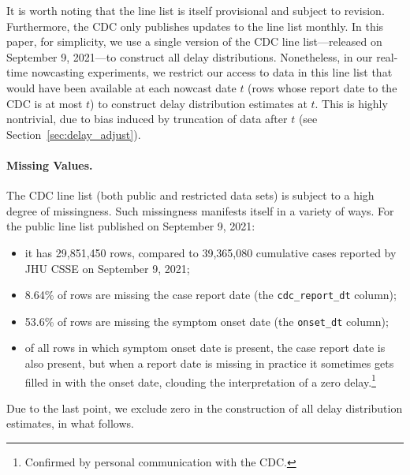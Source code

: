 \documentclass[sts]{imsart}
\theoremstyle{plain}
\theoremstyle{definition}
\theoremstyle{remark}
\begin{document}
It is worth noting that the line list is itself provisional and subject to
revision. Furthermore, the CDC only publishes updates to the line list
monthly. In this paper, for simplicity, we use a single version of the CDC line
list---released on September 9, 2021---to construct all delay
distributions. Nonetheless, in our real-time nowcasting experiments, we 
restrict our access to data in this line list that would have been available at
each nowcast date $t$ (rows whose report date to the CDC is at most $t$) to
construct delay distribution estimates at $t$. This is highly nontrivial, due to
bias induced by truncation of data after $t$ (see
Section~\ref{sec:delay_adjust}). 

\smallskip
\paragraph*{Missing Values.}

The CDC line list (both public and restricted data sets) is subject to a high
degree of missingness. Such missingness manifests itself in a variety of
ways. For the public line list published on September 9, 2021: 
\begin{itemize}
\item it has 29,851,450 rows, compared to 39,365,080 cumulative cases reported  
  by JHU CSSE on September 9, 2021;
\item 8.64\% of rows are missing the case report date (the
  \texttt{cdc\_report\_dt} column);    
\item 53.6\% of rows are missing the symptom onset date (the \texttt{onset\_dt}
  column);   
\item of all rows in which symptom onset date is present, the case report date
  is also present, but when a report date is missing in practice it sometimes 
  gets filled in with the onset date, clouding the interpretation of a zero 
  delay.\footnote{Confirmed by personal communication with the CDC.}     
\end{itemize}
Due to the last point, we exclude zero in the construction of all delay
distribution estimates, in what follows. 
\end{document}
